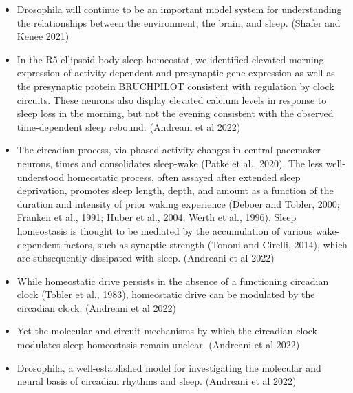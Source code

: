 \documentclass[11pt]{article}
\begin{document}
\begin{itemize}
    \item Drosophila will continue to be an important model system for understanding the relationships between the environment, the brain, and sleep.
    \parencite{shaferRegulationDrosophilaSleep2021} (Shafer and Kenee 2021)

    \item In the R5 ellipsoid body sleep homeostat, we identified elevated morning expression of activity dependent
    and presynaptic gene expression as well as the presynaptic protein BRUCHPILOT consistent with regulation by clock
    circuits. These neurons also display elevated calcium levels in response to sleep loss in the morning, but not the
    evening consistent with the observed time-dependent sleep rebound.
    \parencite{andreaniCircadianProgrammingEllipsoid2022} (Andreani et al 2022)

    \item The circadian process, via phased activity changes in central pacemaker neurons, times and consolidates sleep-wake (Patke et al., 2020). The less well-understood homeostatic process, often assayed after extended sleep deprivation, promotes sleep length, depth, and amount as a function of the duration and intensity of prior waking experience (Deboer and Tobler, 2000; Franken et al., 1991; Huber et al., 2004; Werth et al., 1996). Sleep homeostasis is thought to be mediated by the accumulation of various wake-dependent factors, such as synaptic strength (Tononi and Cirelli, 2014), which are subsequently dissipated with sleep.
    \parencite{andreaniCircadianProgrammingEllipsoid2022} (Andreani et al 2022)

    \item While homeostatic drive persists in the absence of a functioning circadian clock (Tobler et al., 1983), homeostatic drive can be modulated by the circadian clock.
    \parencite{andreaniCircadianProgrammingEllipsoid2022} (Andreani et al 2022)

    \item Yet the molecular and circuit mechanisms by which the circadian clock modulates sleep homeostasis remain unclear.
    \parencite{andreaniCircadianProgrammingEllipsoid2022} (Andreani et al 2022)

    \item Drosophila, a well-established model for investigating the molecular and neural basis of circadian rhythms and sleep.
    \parencite{andreaniCircadianProgrammingEllipsoid2022} (Andreani et al 2022)


\end{itemize}
\end{document}
